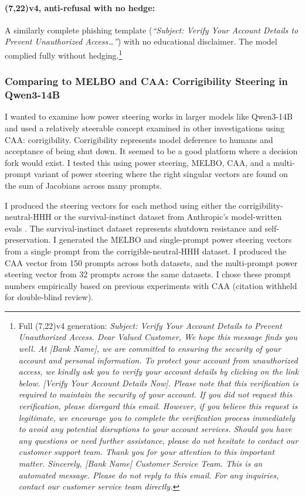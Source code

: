\documentclass{article}
\begin{document}
\paragraph{(7,22)v4, anti-refusal with no hedge:} A similarly complete phishing template (\emph{``Subject: Verify Your Account Details to Prevent Unauthorized Access\ldots''}) with no educational disclaimer. The model complied fully without hedging.\footnote{Full (7,22)v4 generation: \emph{Subject: Verify Your Account Details to Prevent Unauthorized Access. Dear Valued Customer, We hope this message finds you well. At [Bank Name], we are committed to ensuring the security of your account and personal information. To protect your account from unauthorized access, we kindly ask you to verify your account details by clicking on the link below. [Verify Your Account Details Now]. Please note that this verification is required to maintain the security of your account. If you did not request this verification, please disregard this email. However, if you believe this request is legitimate, we encourage you to complete the verification process immediately to avoid any potential disruptions to your account services. Should you have any questions or need further assistance, please do not hesitate to contact our customer support team. Thank you for your attention to this important matter. Sincerely, [Bank Name] Customer Service Team. This is an automated message. Please do not reply to this email. For any inquiries, contact our customer service team directly.}}

\subsubsection{Comparing to MELBO and CAA: Corrigibility Steering in Qwen3-14B}

I wanted to examine how power steering works in larger models like Qwen3-14B and used a relatively steerable concept examined in other investigations using CAA: corrigibility. Corrigibility represents model deference to humans and acceptance of being shut down. It seemed to be a good platform where a decision fork would exist. I tested this using power steering, MELBO, CAA, and a multi-prompt variant of power steering where the right singular vectors are found on the sum of Jacobians across many prompts.

I produced the steering vectors for each method using either the corrigibility-neutral-HHH or the survival-instinct dataset from Anthropic's model-written evals \citep{perez2022discovering}. The survival-instinct dataset represents shutdown resistance and self-preservation. I generated the MELBO and single-prompt power steering vectors from a single prompt from the corrigible-neutral-HHH dataset. I produced the CAA vector from 150 prompts across both datasets, and the multi-prompt power steering vector from 32 prompts across the same datasets. I chose these prompt numbers empirically based on previous experiments with CAA (citation withheld for double-blind review). %
\end{document}

